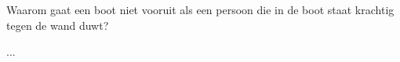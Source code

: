 

\item{}Waarom gaat een boot niet vooruit als een persoon die in de boot staat krachtig tegen de wand duwt?


\begin{oplossing}
...
\end{oplossing}